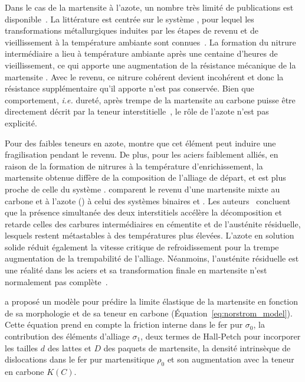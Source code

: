 Dans le cas de la martensite à l'azote, un nombre très limité de publications est disponible~\cite{Catteau2014,Catteau2016}. La littérature est centrée sur le système , pour lequel les transformations métallurgiques induites par les étapes de revenu et de vieillissement à la température ambiante sont connues~\cite{Kaplow1983,vanGent1985,Mittemeijer1988,Cheng199013,Cheng19902857,Fall1996,vanGenderen1997,Sherby2008}. La formation du nitrure intermédiaire  a lieu à température ambiante après une centaine d'heures de vieillissement, ce qui apporte une augmentation de la résistance mécanique de la martensite . Avec le revenu, ce nitrure cohérent devient incohérent et donc la résistance supplémentaire qu'il apporte n'est pas conservée. Bien que comportement, \emph{i.e.} dureté, après trempe de la martensite au carbone puisse être directement décrit par la teneur interstitielle~\cite{Cohen1968,Norstrom1976,Krauss1999,Hutchinson20115845}, le rôle de l'azote n'est pas explicité. 

Pour des faibles teneurs en azote, \citet{Briant1982} montre que cet élément peut induire une fragilisation pendant le revenu. De plus, pour les aciers faiblement alliés, en raison de la formation de nitrures à la température d'enrichissement, la martensite obtenue diffère de la composition de l'alliage de départ, et est plus proche de celle du système . \citet{Cheng1992} comparent le revenu d'une martensite mixte au carbone et à l'azote () à celui des systèmes binaires  et . Les auteurs~\cite{Cheng1992} concluent que la présence simultanée des deux interstitiels accélère la décomposition  et retarde celles des carbures intermédiaires en cémentite et de l'austénite résiduelle, lesquels restent métastables à des températures plus élevées. L'azote en solution solide réduit également la vitesse critique de refroidissement pour la trempe \textendash{} augmentation de la trempabilité de l'alliage. Néanmoins, l'austénite résiduelle est une réalité dans les aciers et sa transformation finale en martensite n'est normalement pas complète~\cite{Steel2006}.

\citet{Norstrom1976} a proposé un modèle pour prédire la limite élastique de la martensite en fonction de sa morphologie et de sa teneur en carbone (Équation~\ref{eq:norstrom_model}). Cette équation prend en compte la friction interne dans le fer pur $\sigma_{0}$, la contribution des éléments d'alliage $\sigma_{1}$, deux termes de Hall-Petch pour incorporer les tailles $d$ des lattes et $D$ des paquets de martensite, la densité intrinsèque de dislocations dans le fer pur martensitique $\rho_{0}$ et son augmentation avec la teneur en carbone $K(C)$.


